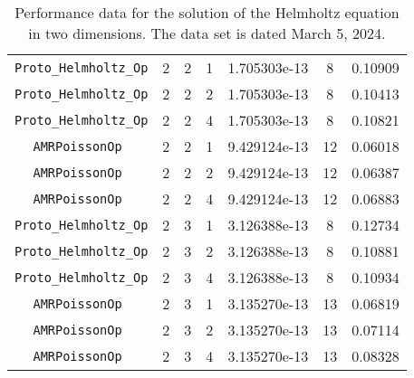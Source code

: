 \documentclass{article}
\begin{document}
\begin{small}
\begin{table}
\begin{center}
\begin{tabular}{|c|c|c|c|c|c||c|}
\hline                                                                            
 {\tt Proto\_Helmholtz\_Op} & 2 & 2 & 1   & 1.705303e-13   & 8       & 0.10909    \\
 {\tt Proto\_Helmholtz\_Op} & 2 & 2 & 2   & 1.705303e-13   & 8       & 0.10413    \\
 {\tt Proto\_Helmholtz\_Op} & 2 & 2 & 4   & 1.705303e-13   & 8       & 0.10821    \\
\hline                                                         
 {\tt AMRPoissonOp        } & 2 & 2 & 1   & 9.429124e-13   & 12      & 0.06018    \\
 {\tt AMRPoissonOp        } & 2 & 2 & 2   & 9.429124e-13   & 12      & 0.06387    \\
 {\tt AMRPoissonOp        } & 2 & 2 & 4   & 9.429124e-13   & 12      & 0.06883    \\
 \hline                                                        
 {\tt Proto\_Helmholtz\_Op} & 2 & 3 & 1   & 3.126388e-13   & 8       & 0.12734    \\
 {\tt Proto\_Helmholtz\_Op} & 2 & 3 & 2   & 3.126388e-13   & 8       & 0.10881    \\
 {\tt Proto\_Helmholtz\_Op} & 2 & 3 & 4   & 3.126388e-13   & 8       & 0.10934    \\
\hline                                                         
 {\tt AMRPoissonOp        } & 2 & 3 & 1   & 3.135270e-13   & 13      & 0.06819   \\
 {\tt AMRPoissonOp        } & 2 & 3 & 2   & 3.135270e-13   & 13      & 0.07114   \\
 {\tt AMRPoissonOp        } & 2 & 3 & 4   & 3.135270e-13   & 13      & 0.08328   \\
 \hline
\end{tabular}
\end{center}
\label{tab::3}
\caption
    {
      Performance data for the solution of the Helmholtz
      equation in two dimensions.    
      The data set is dated March 5, 2024.
    }
\end{table}
\end{small}
\end{document}
